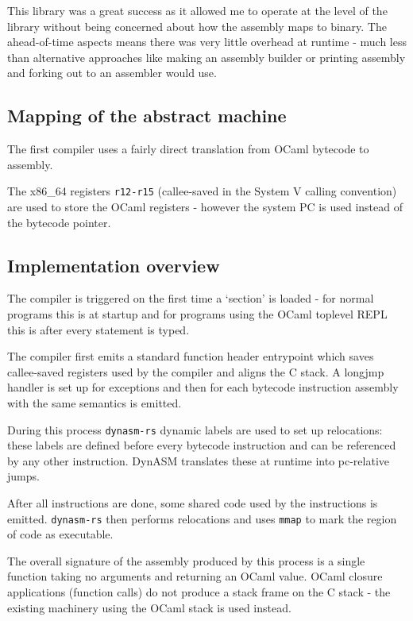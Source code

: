 This library was a great success as it allowed me to operate at the level of the library without
being concerned about how the assembly maps to binary. The ahead-of-time aspects means there was
very little overhead at runtime - much less than alternative approaches like making an assembly
builder or printing assembly and forking out to an assembler would use.

\subsection{Mapping of the abstract machine}

The first compiler uses a fairly direct translation from OCaml bytecode to assembly.

The x86\_64 registers \texttt{r12-r15} (callee-saved in the System V calling convention) are used
to store the OCaml registers - however the system PC is used instead of the bytecode pointer.

\subsection{Implementation overview}

The compiler is triggered on the first time a `section' is loaded - for normal programs this is at
startup and for programs using the OCaml toplevel REPL this is after every statement is typed.

The compiler first emits a standard function header entrypoint which saves callee-saved registers
used by the compiler and aligns the C stack. A longjmp handler is set up for exceptions and then
for each bytecode instruction assembly with the same semantics is emitted.

During this process \texttt{dynasm-rs} dynamic labels are used to set up relocations: these
labels are defined before every bytecode instruction and can be referenced by any other
instruction. DynASM translates these at runtime into pc-relative jumps.

After all instructions are done, some shared code used by the instructions is emitted.
\texttt{dynasm-rs} then performs relocations and uses \texttt{mmap} to mark the region of code as
executable.

The overall signature of the assembly produced by this process is a single function taking no
arguments and returning an OCaml value. OCaml closure applications (function calls) do not produce
a stack frame on the C stack - the existing machinery using the OCaml stack is used instead.

